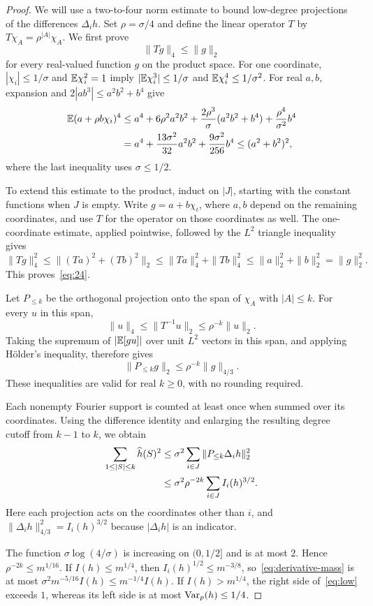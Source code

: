 \begin{proof}
We will use a two-to-four norm estimate to bound low-degree projections
of the differences $\Delta_i h$.
Set $\rho=\sigma/4$ and define the linear operator $T$ by
$T\chi_A=\rho^{|A|}\chi_A$. We first prove
\begin{equation}\label{eq:24}
 \|Tg\|_4\le\|g\|_2
\end{equation}
for every real-valued function $g$ on the product space.
For one coordinate, $|\chi_i|\le1/\sigma$ and $\mathbb E\chi_i^2=1$
imply $|\mathbb E\chi_i^3|\le1/\sigma$ and
$\mathbb E\chi_i^4\le1/\sigma^2$. For real $a,b$, expansion and
$2|ab^3|\le a^2b^2+b^4$ give
\begin{align*}
 \mathbb E(a+\rho b\chi_i)^4
 &\le a^4+6\rho^2a^2b^2+
       \frac{2\rho^3}{\sigma}(a^2b^2+b^4)
       +\frac{\rho^4}{\sigma^2}b^4\\
 &=a^4+\frac{13\sigma^2}{32}a^2b^2
       +\frac{9\sigma^2}{256}b^4
 \le(a^2+b^2)^2,
\end{align*}
where the last inequality uses $\sigma\le1/2$.

To extend this estimate to the product, induct on $|J|$, starting with
the constant functions when $J$ is empty. Write $g=a+b\chi_i$,
where $a,b$ depend on the remaining coordinates, and use $T$ for the
operator on those coordinates as well. The one-coordinate estimate,
applied pointwise, followed by the $L^2$ triangle inequality gives
\[
 \|Tg\|_4^2\le\|(Ta)^2+(Tb)^2\|_2
 \le\|Ta\|_4^2+\|Tb\|_4^2
 \le\|a\|_2^2+\|b\|_2^2=\|g\|_2^2.
\]
This proves~\eqref{eq:24}.

Let $P_{\le k}$ be the orthogonal projection onto the span of
$\chi_A$ with $|A|\le k$. For every $u$ in this span,
\[
 \|u\|_4\le\|T^{-1}u\|_2\le\rho^{-k}\|u\|_2.
\]
Taking the supremum of $|\mathbb E[gu]|$ over unit $L^2$ vectors in this
span, and applying H\"older's inequality, therefore gives
\begin{equation}\label{eq:projection}
 \|P_{\le k}g\|_2\le\rho^{-k}\|g\|_{4/3}.
\end{equation}
These inequalities are valid for real $k\ge0$, with no rounding
required.

Each nonempty Fourier support is counted at least once when summed
over its coordinates. Using the difference identity and enlarging
the resulting degree cutoff from $k-1$ to $k$, we obtain
\begin{align}
 \sum_{1\le|S|\le k}\widehat h(S)^2
 &\le\sigma^2\sum_{i\in J}
       \|P_{\le k}\Delta_i h\|_2^2 \notag\\
 &\le\sigma^2\rho^{-2k}\sum_{i\in J}I_i(h)^{3/2}.
 \label{eq:derivative-mass}
\end{align}
Here each projection acts on the coordinates other than $i$, and
$\|\Delta_i h\|_{4/3}^2=I_i(h)^{3/2}$ because
$|\Delta_i h|$ is an indicator.

The function $\sigma\log(4/\sigma)$ is increasing on $(0,1/2]$
and is at most $2$. Hence $\rho^{-2k}\le m^{1/16}$.
If $I(h)\le m^{1/4}$, then
$I_i(h)^{1/2}\le m^{-3/8}$, so~\eqref{eq:derivative-mass}
is at most $\sigma^2m^{-5/16}I(h)\le m^{-1/4}I(h)$.
If $I(h)>m^{1/4}$, the right side of~\eqref{eq:low} exceeds $1$,
whereas its left side is at most $\operatorname{Var}_p(h)\le1/4$.
\end{proof}
